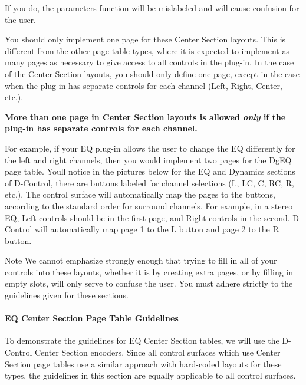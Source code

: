 If you do, the parameter\textquotesingle{}s function will be mislabeled and will cause confusion for the user.

You should only implement one page for these Center Section layouts. This is different from the other page table types, where it is expected to implement as many pages as necessary to give access to all controls in the plug-\/in. In the case of the Center Section layouts, you should only define one page, except in the case when the plug-\/in has separate controls for each channel (Left, Right, Center, etc.).

 {\bfseries  More than one page in Center Section layouts is allowed {\itshape  only} if the plug-\/in has separate controls for each channel.} 

For example, if your E\+Q plug-\/in allows the user to change the E\+Q differently for the left and right channels, then you would implement two pages for the Dg\+E\+Q page table. You\textquotesingle{}ll notice in the pictures below for the E\+Q and Dynamics sections of D-\/\+Control, there are buttons labeled for channel selections (L, L\+C, C, R\+C, R, etc.). The control surface will automatically map the pages to the buttons, according to the standard order for surround channels. For example, in a stereo E\+Q, Left controls should be in the first page, and Right controls in the second. D-\/\+Control will automatically map page 1 to the L button and page 2 to the R button.

\begin{DoxyNote}{Note}
We cannot emphasize strongly enough that trying to fill in all of your controls into these layouts, whether it is by creating extra pages, or by filling in empty slots, will only serve to confuse the user. You must adhere strictly to the guidelines given for these sections.
\end{DoxyNote}
\hypertarget{a00363_aax_page_table_guide_04_avid_center_section_page_tables_guidelines_eq}{}\paragraph{E\+Q Center Section Page Table Guidelines}\label{a00363_aax_page_table_guide_04_avid_center_section_page_tables_guidelines_eq}
 To demonstrate the guidelines for E\+Q Center Section tables, we will use the D-\/\+Control Center Section encoders. Since all control surfaces which use Center Section page tables use a similar approach with hard-\/coded layouts for these types, the guidelines in this section are equally applicable to all control surfaces.

